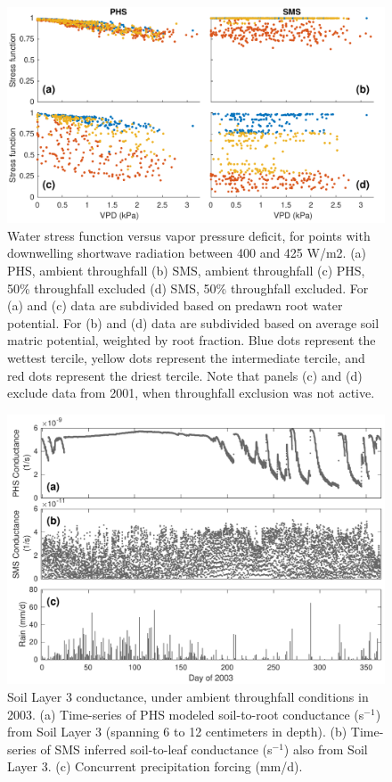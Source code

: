 \documentclass[draft,linenumbers]{agujournal}
\begin{document}
      \clearpage
    \begin{figure}[h]
     \centering
     \includegraphics[width=30pc]{../figs2/fig5.pdf}
     \caption{Water stress function versus vapor pressure deficit, for points with downwelling shortwave radiation between 400 and 425 W/m2.
     (a) PHS, ambient throughfall
     (b) SMS, ambient throughfall
     (c) PHS, 50\% throughfall excluded
     (d) SMS, 50\% throughfall excluded. 
     For (a) and (c) data are subdivided based on predawn root water potential.
     For (b) and (d) data are subdivided based on average soil matric potential, weighted by root fraction.
     Blue dots represent the wettest tercile, yellow dots represent the intermediate tercile, and red dots represent the driest tercile.
     Note that panels (c) and (d) exclude data from 2001, when throughfall exclusion was not active.
     }
     \label{fig5}
       \end{figure}
  
  
\clearpage   
  \begin{figure}[h]
     \centering
     \includegraphics[width=30pc]{../figs2/fig6.pdf}
     \caption{Soil Layer 3 conductance, under ambient throughfall conditions in 2003. 
     (a) Time-series of PHS modeled soil-to-root conductance (s$^{-1}$) from Soil Layer 3 (spanning 6 to 12 centimeters in depth).
     (b) Time-series of SMS inferred soil-to-leaf conductance (s$^{-1}$) also from Soil Layer 3.
     (c) Concurrent precipitation forcing (mm/d).
     }
     \label{fig:cond}
  \end{figure}
  
\end{document}

